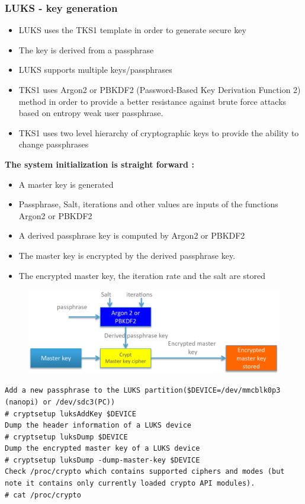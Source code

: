 \documentclass[resume]{subfiles}
\begin{document}
\subsubsection{LUKS - key generation}
\begin{itemize}
\item LUKS uses the TKS1 template in order to generate secure key
\item The key is derived from a passphrase
\item LUKS supports multiple keys/passphrases
\item TKS1 uses Argon2 or PBKDF2 (Password-Based Key Derivation Function 2) method in order to provide a better resistance against brute force attacks based on entropy weak user passphrase.
\item TKS1 uses two level hierarchy of cryptographic keys to provide the ability to change passphrases
\end{itemize}

\textbf{The system initialization is straight forward :}
\begin{itemize}
\item A master key is generated
\item Passphrase, Salt, iterations and other values are inputs of the functions Argon2 or PBKDF2
\item A derived passphrase key is computed by Argon2 or PBKDF2
\item The master key is encrypted by the derived passphrase key.
\item The encrypted master key, the iteration rate and the salt are stored
\end{itemize}

\begin{figure}[H]
    \centering
    \includegraphics[width=1\columnwidth]{Figures/fileSystem/luksKeyGen.png}
    \label{fig:luksKeyGen}
\end{figure}

\begin{lstlisting}[style=console,label={},caption={}]
Add a new passphrase to the LUKS partition($DEVICE=/dev/mmcblk0p3 (nanopi) or /dev/sdc3(PC))
# cryptsetup luksAddKey $DEVICE
Dump the header information of a LUKS device
# cryptsetup luksDump $DEVICE
Dump the encrypted master key of a LUKS device
# cryptsetup luksDump -dump-master-key $DEVICE
Check /proc/crypto which contains supported ciphers and modes (but note it contains only currently loaded crypto API modules).
# cat /proc/crypto
\end{lstlisting}
\end{document}
